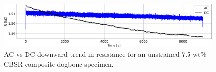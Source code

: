 \begin{figure}[H]
	\centering
	\includegraphics[width=\linewidth]{Figures/AC_vs_DC_long_decay_2_7-5_CBSR}
	\caption{AC vs DC downward trend in resistance for an unstrained 7.5 wt\% CBSR composite dogbone specimen.}
	\label{fig:res-AC-DC}
\end{figure}

